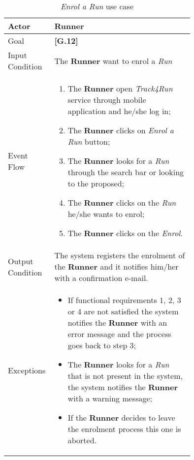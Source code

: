 \begin{center}
\begin{table}
\begin{tabular}{ | l | p{0.75\linewidth} | }
  \hline
    Actor & \textbf{Runner} \\ \hline
    Goal & \textbf{[G.12]} \\ \hline
    Input Condition & The \textbf{Runner} want to enrol a \textit{Run} \\ \hline
    Event Flow & \begin{minipage}[t]{0.7\textwidth}
      \begin{enumerate}
        \item The \textbf{Runner} open \textit{Track4Run} service through mobile application and he/she log in;
        \item The \textbf{Runner} clicks on \textit{Enrol a Run} button;
        \item The \textbf{Runner} looks for a \textit{Run} through the search bar or looking to the proposed;
        \item The \textbf{Runner} clicks on the \textit{Run} he/she wants to enrol;
        \item The \textbf{Runner} clicks on the \textit{Enrol}.
      \end{enumerate}
    \smallskip
  \end{minipage} \\ \hline
  Output Condition & The system registers the enrolment of the \textbf{Runner} and it notifies him/her with a confirmation e-mail. \\ \hline
  Exceptions & \begin{minipage}[t]{0.7\textwidth}
    \begin{itemize}
      \smallskip
      \item If functional requirements 1, 2, 3 or 4 are not satisfied the system notifies the \textbf{Runner} with an error message and the process goes back to step 3;
      \item The \textbf{Runner} looks for a \textit{Run} that is not present in the system, the system notifies the \textbf{Runner} with a warning message;
      \item If the \textbf{Runner} decides to leave the enrolment process this one is aborted.
    \end{itemize}
    \smallskip
  \end{minipage}  \\ \hline
\end{tabular}
\caption{\textit{Enrol a Run} use case}
\label{table:enrolRunTable}
\end{table}
\end{center}
